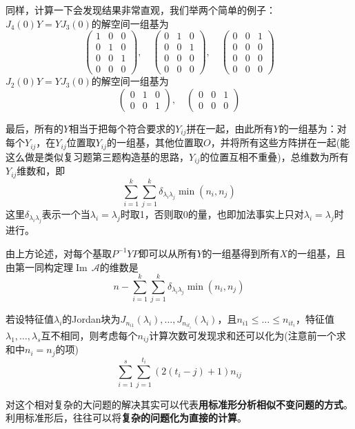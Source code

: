 \documentclass[a4paper,UTF8,fontset=windows,AutoFakeBold]{ctexart}
\DeclareMathOperator{\im}{Im\,}
\newcommand*{\ma}{\mathcal{A}}
\newcommand*{\note}{\noindent *}
\begin{document}
\begin{enumerate}
\begin{enumerate}
\begin{itemize}
            \note 同样，计算一下会发现结果非常直观，我们举两个简单的例子：$J_4(0)Y=YJ_3(0)$的解空间一组基为
            $$\begin{pmatrix}1&0&0\\0&1&0\\0&0&1\\0&0&0\end{pmatrix},\quad \begin{pmatrix}0&1&0\\0&0&1\\0&0&0\\0&0&0\end{pmatrix},\quad \begin{pmatrix}0&0&1\\0&0&0\\0&0&0\\0&0&0\end{pmatrix}$$
            $J_2(0)Y=YJ_3(0)$的解空间一组基为
            $$\begin{pmatrix}0&1&0\\0&0&1\end{pmatrix},\quad\begin{pmatrix}0&0&1\\0&0&0\end{pmatrix}$$
        \end{itemize}
        最后，所有的$Y$相当于把每个符合要求的$Y_{ij}$拼在一起，由此所有$Y$的一组基为：对每个$Y_{ij}$，在$Y_{ij}$位置取$Y_{ij}$的一组基，其他位置取$O$，并将所有这些方阵拼在一起(能这么做是类似复习题第三题构造基的思路，$Y_{ij}$的位置互相不重叠)，总维数为所有$Y_{ij}$维数和，即
        $$\sum_{i=1}^k\sum_{j=1}^k\delta_{\lambda_i\lambda_j}\min(n_i,n_j)$$
        这里$\delta_{\lambda_i\lambda_j}$表示一个当$\lambda_i=\lambda_j$时取1，否则取0的量，也即加法事实上只对$\lambda_i=\lambda_j$时进行。

        由上方论述，对每个基取$P^{-1}YP$即可以从所有$Y$的一组基得到所有$X$的一组基，且由第一同构定理$\im\ma$的维数是
        $$n-\sum_{i=1}^k\sum_{j=1}^k\delta_{\lambda_i\lambda_j}\min(n_i,n_j)$$

        \note 若设特征值$\lambda_i$的Jordan块为$J_{n_{i1}}(\lambda_i),\dots,J_{n_{it_i}}(\lambda_i)$，且$n_{i1}\le\dots\le n_{it_i}$，特征值$\lambda_1,\dots,\lambda_s$互不相同，则考虑每个$n_{ij}$计算次数可发现求和还可以化为(注意前一个求和中$n_i=n_j$的项)
        $$\sum_{i=1}^s\sum_{j=1}^{t_i}(2(t_i-j)+1)n_{ij}$$

        \note 对这个相对复杂的大问题的解决其实可以代表\textbf{用标准形分析相似不变问题的方式}。利用标准形后，往往可以将\textbf{复杂的问题化为直接的计算}。
    \end{enumerate}


\end{enumerate}
\end{document}
